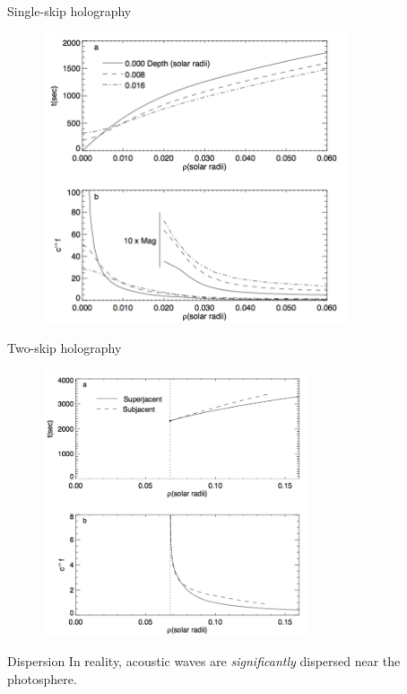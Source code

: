 \documentclass{beamer}
\begin{document}
\begin{frame}{Single-skip holography}
    \begin{figure}
        \includegraphics[width=0.8\textwidth]{fig_8.png}
    \end{figure}
\end{frame}
\begin{frame}{Two-skip holography}
    \begin{figure}
        \includegraphics[width=0.7\textwidth]{fig_9.png}
    \end{figure}
\end{frame}

\begin{frame}{Dispersion}
    In reality, acoustic waves are \emph{significantly} dispersed
    near the photosphere.
\end{frame}
\end{document}
